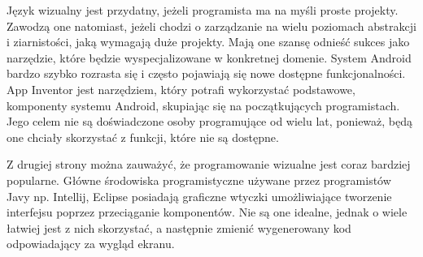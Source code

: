 Język wizualny jest przydatny, jeżeli programista ma na myśli proste projekty. Zawodzą one natomiast, jeżeli chodzi o zarządzanie na wielu poziomach abstrakcji i ziarnistości, jaką wymagają duże projekty. Mają one szansę odnieść sukces jako narzędzie, które będzie wyspecjalizowane w konkretnej domenie. System Android bardzo szybko rozrasta się i często pojawiają się nowe dostępne funkcjonalności. App Inventor jest narzędziem, który potrafi wykorzystać podstawowe, komponenty systemu Android, skupiając się na początkujących programistach. Jego celem nie są doświadczone osoby programujące od wielu lat, ponieważ, będą one chciały skorzystać z funkcji, które nie są dostępne.

Z drugiej strony można zauważyć, że programowanie wizualne jest coraz bardziej popularne. Główne środowiska programistyczne używane przez programistów Javy np. Intellij, Eclipse posiadają graficzne wtyczki umożliwiające tworzenie interfejsu poprzez przeciąganie komponentów. Nie są one idealne, jednak o wiele łatwiej jest z nich skorzystać, a następnie zmienić wygenerowany kod odpowiadający za wygląd ekranu.





